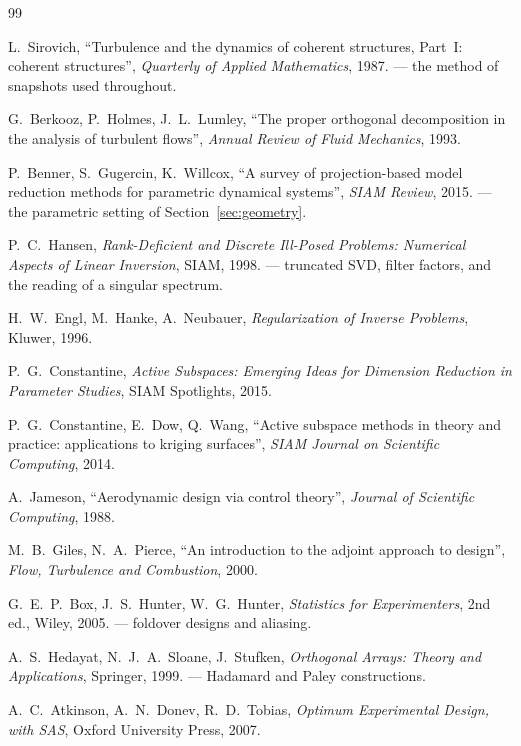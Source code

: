 \documentclass[11pt,a4paper]{article}
\theoremstyle{plain}
\theoremstyle{definition}
\theoremstyle{remark}
\begin{document}
\begin{thebibliography}{99}
\small

 L.~Sirovich, ``Turbulence and the dynamics of coherent
structures, Part~I: coherent structures'', \emph{Quarterly of Applied
Mathematics}, 1987. --- the method of snapshots used throughout.

 G.~Berkooz, P.~Holmes, J.~L.~Lumley, ``The proper orthogonal
decomposition in the analysis of turbulent flows'', \emph{Annual Review of Fluid
Mechanics}, 1993.

 P.~Benner, S.~Gugercin, K.~Willcox, ``A survey of
projection-based model reduction methods for parametric dynamical systems'',
\emph{SIAM Review}, 2015. --- the parametric setting of Section~\ref{sec:geometry}.

 P.~C.~Hansen, \emph{Rank-Deficient and Discrete Ill-Posed
Problems: Numerical Aspects of Linear Inversion}, SIAM, 1998. --- truncated
SVD, filter factors, and the reading of a singular spectrum.

 H.~W.~Engl, M.~Hanke, A.~Neubauer, \emph{Regularization of
Inverse Problems}, Kluwer, 1996.

 P.~G.~Constantine, \emph{Active Subspaces: Emerging
Ideas for Dimension Reduction in Parameter Studies}, SIAM Spotlights, 2015.

 P.~G.~Constantine, E.~Dow, Q.~Wang, ``Active
subspace methods in theory and practice: applications to kriging surfaces'',
\emph{SIAM Journal on Scientific Computing}, 2014.

 A.~Jameson, ``Aerodynamic design via control theory'',
\emph{Journal of Scientific Computing}, 1988.

 M.~B.~Giles, N.~A.~Pierce, ``An introduction to the adjoint
approach to design'', \emph{Flow, Turbulence and Combustion}, 2000.

 G.~E.~P.~Box, J.~S.~Hunter, W.~G.~Hunter, \emph{Statistics for
Experimenters}, 2nd ed., Wiley, 2005. --- foldover designs and aliasing.

 A.~S.~Hedayat, N.~J.~A.~Sloane, J.~Stufken, \emph{Orthogonal
Arrays: Theory and Applications}, Springer, 1999. --- Hadamard and Paley
constructions.

 A.~C.~Atkinson, A.~N.~Donev, R.~D.~Tobias, \emph{Optimum
Experimental Design, with SAS}, Oxford University Press, 2007.


\end{thebibliography}
\end{document}
